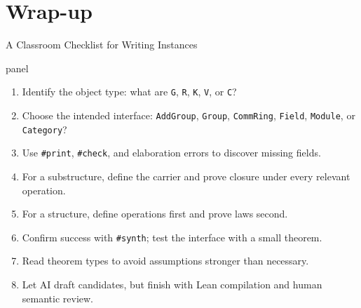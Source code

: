 \documentclass[aspectratio=169,10pt]{beamer}
\newenvironment{dpanel}{%
  \begin{beamercolorbox}[wd=\dimexpr\linewidth-9pt\relax,leftskip=0.15cm,rightskip=0.15cm plus1fil,rounded=true]{panel}%
  \setlength{\linewidth}{\hsize}%
  \vspace{0.10cm}%
}{\vspace{0.10cm}\end{beamercolorbox}}
\begin{document}
\section{Wrap-up}

\begin{frame}{A Classroom Checklist for Writing Instances}
\begin{dpanel}
\begin{enumerate}
  \item Identify the object type: what are \texttt{G}, \texttt{R}, \texttt{K}, \texttt{V}, or \texttt{C}?
  \item Choose the intended interface: \texttt{AddGroup}, \texttt{Group}, \texttt{CommRing}, \texttt{Field}, \texttt{Module}, or \texttt{Category}?
  \item Use \texttt{\#print}, \texttt{\#check}, and elaboration errors to discover missing fields.
  \item For a substructure, define the carrier and prove closure under every relevant operation.
  \item For a structure, define operations first and prove laws second.
  \item Confirm success with \texttt{\#synth}; test the interface with a small theorem.
  \item Read theorem types to avoid assumptions stronger than necessary.
  \item Let AI draft candidates, but finish with Lean compilation and human semantic review.
\end{enumerate}
\end{dpanel}
\end{frame}
\end{document}
